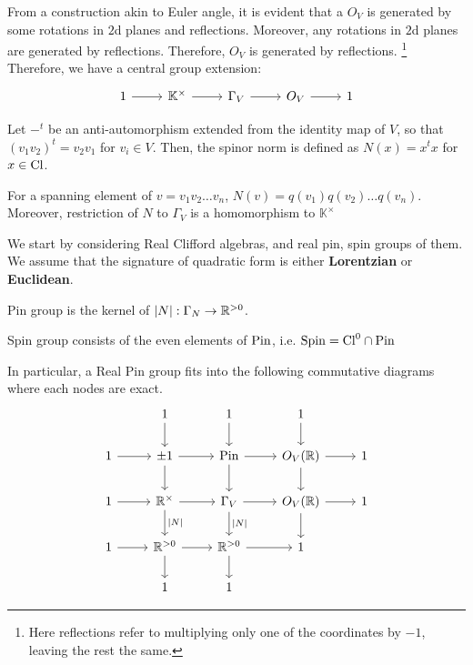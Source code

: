 \documentclass[a4paper,11pt]{article}
\begin{document}
\begin{appendices}
From a construction akin to Euler angle, it is evident that a $O_V$ is generated by some rotations in $2$d planes and reflections. Moreover, any rotations in $2$d planes are generated by reflections. Therefore, $O_V$ is generated by reflections. \footnote{Here reflections refer to multiplying only one of the coordinates by ${-1}$, leaving the rest the same.} Therefore, we have a central group extension:
\begin{equation}
    \begin{tikzcd}
    	1 & {\mathbb{K}^{\times}} & {\Gamma_V} & {O_V} & 1
    	\arrow[from=1-1, to=1-2]
    	\arrow[from=1-2, to=1-3]
    	\arrow[from=1-3, to=1-4]
    	\arrow[from=1-4, to=1-5]
    \end{tikzcd}
\end{equation}

\begin{definition}
    Let $-^t$ be an anti-automorphism extended from the identity map of $V$, so that $(v_1v_2)^t=v_2v_1$ for $v_i \in V$. Then, the spinor norm is defined as $N(x)=x^tx$ for $x \in {\rm Cl}$.
\end{definition}
\begin{remark}
    For a spanning element of $v=v_1v_2\dots v_n$, $N(v)=q(v_1)q(v_2)\dots q(v_n)$. Moreover, restriction of $N$ to $\Gamma_V$ is a homomorphism to  ${\mathbb K}^{\times}$
\end{remark}
We start by considering Real Clifford algebras, and real pin, spin groups of them. We assume that the signature of quadratic form is either {\bf Lorentzian} or {\bf Euclidean}. 
\begin{definition}
    Pin group is the kernel of $|N|:\Gamma_N \to \mathbb{R}^{>0}$.
\end{definition}
\begin{definition}
    Spin group consists of the even elements of ${\rm Pin}$, i.e. ${\rm Spin}={\rm Cl}^{0}\cap {\rm Pin}$
\end{definition}
In particular, a Real Pin group fits into the following commutative diagrams where each nodes are exact.
\begin{equation}
\begin{tikzcd}
	& 1 & 1 & 1 & \\
	1 & {\pm 1} & {{\rm Pin}} & {O_V(\R)} & 1 \\
	1 & {{\mathbb R}^{\times}} & {\Gamma_V} & {O_V(\R)} & 1 \\
	1 & {\mathbb{R}^{>0}} & {\mathbb{R}^{>0}} & 1 \\
	& 1 & 1
	\arrow[from=1-2, to=2-2]
	\arrow[from=1-3, to=2-3]
	\arrow[from=1-4, to=2-4]
	\arrow[from=2-1, to=2-2]
	\arrow[from=2-2, to=2-3]
	\arrow[from=2-2, to=3-2]
	\arrow[from=2-3, to=2-4]
	\arrow[from=2-3, to=3-3]
	\arrow[from=2-4, to=2-5]
	\arrow[from=2-4, to=3-4]
	\arrow[from=3-1, to=3-2]
	\arrow[from=3-2, to=3-3]
	\arrow["{|N|}", from=3-2, to=4-2]
	\arrow[from=3-3, to=3-4]
	\arrow["{|N|}", from=3-3, to=4-3]
	\arrow[from=3-4, to=3-5]
	\arrow[from=3-4, to=4-4]
	\arrow[from=4-1, to=4-2]
	\arrow[from=4-2, to=4-3]
	\arrow[from=4-2, to=5-2]
	\arrow[from=4-3, to=4-4]
	\arrow[from=4-3, to=5-3]
\end{tikzcd}
\end{equation}


\end{appendices}
\end{document}
